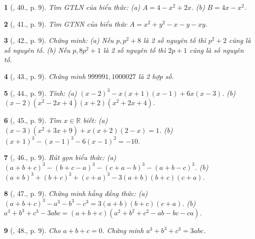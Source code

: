 \documentclass{article}
\newtheorem{baitoan}{}
\begin{document}
\begin{baitoan}[\cite{Binh_Toan_8_tap_1}, 40., p. 9]
	Tìm {\rm GTLN} của biểu thức: (a) $A = 4 - x^2 + 2x$. (b) $B = 4x - x^2$.
\end{baitoan}

\begin{baitoan}[\cite{Binh_Toan_8_tap_1}, 41., p. 9]
	Tìm {\rm GTNN} của biểu thức $A = x^2 + y^2 - x - y - xy$.
\end{baitoan}

\begin{baitoan}[\cite{Binh_Toan_8_tap_1}, 42., p. 9]
	Chứng minh: (a) Nếu $p,p^2 + 8$ là 2 số nguyên tố thì $p^2 + 2$ cũng là số nguyên tố. (b) Nếu $p,8p^2 + 1$ là 2 số nguyên tố thì $2p + 1$ cũng là số nguyên tố.
\end{baitoan}

\begin{baitoan}[\cite{Binh_Toan_8_tap_1}, 43., p. 9]
	Chứng minh $999991,1000027$ là 2 hợp số.
\end{baitoan}

\begin{baitoan}[\cite{Binh_Toan_8_tap_1}, 44., p. 9]
	Tính: (a) $(x - 2)^3 - x(x + 1)(x - 1) + 6x(x - 3)$. (b) $(x - 2)(x^2 - 2x + 4)(x + 2)(x^2 + 2x + 4)$.
\end{baitoan}

\begin{baitoan}[\cite{Binh_Toan_8_tap_1}, 45., p. 9]
	Tìm $x\in\mathbb{R}$ biết: (a) $(x - 3)(x^2 + 3x + 9) + x(x + 2)(2 - x) = 1$. (b) $(x + 1)^3 - (x - 1)^3 - 6(x - 1)^2 = -10$.
\end{baitoan}

\begin{baitoan}[\cite{Binh_Toan_8_tap_1}, 46., p. 9]
	Rút gọn biểu thức: (a) $(a + b + c)^3 - (b + c - a)^3 - (c + a - b)^3 - (a + b - c)^3$. (b) $(a + b)^3 + (b + c)^3 + (c + a)^3 - 3(a + b)(b + c)(c + a)$.
\end{baitoan}

\begin{baitoan}[\cite{Binh_Toan_8_tap_1}, 47., p. 9]
	Chứng minh hằng đẳng thức: (a) $(a + b + c)^3 - a^3 - b^3 - c^3 = 3(a + b)(b + c)(c + a)$. (b) $a^3 + b^3 + c^3 - 3abc = (a + b + c)(a^2 + b^2 + c^2 - ab - bc - ca)$.
\end{baitoan}

\begin{baitoan}[\cite{Binh_Toan_8_tap_1}, 48., p. 9]
	Cho $a + b + c = 0$. Chứng minh $a^3 + b^3 + c^3 = 3abc$.
\end{baitoan}
\end{document}
